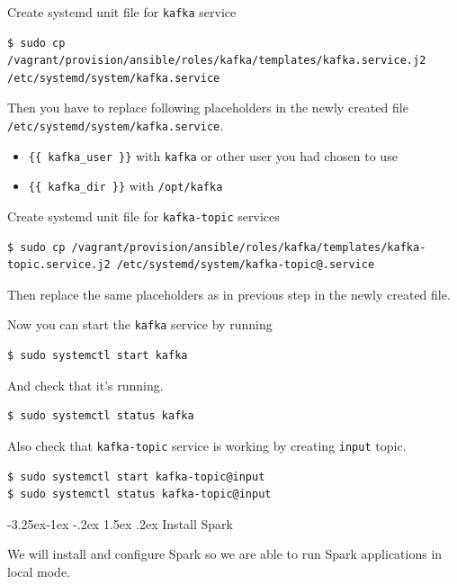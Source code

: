 \documentclass[a4paper]{article} %
\makeatletter
\renewcommand{\normalsize}{\fontsize{12}{15}\selectfont\color{textcolor}}
\renewcommand\subsubsection{\@startsection{subsubsection}{3}{\z@}%
                   {-3.25ex\@plus -1ex \@minus -.2ex}%
                   {1.5ex \@plus .2ex}%
                   {\normalfont\normalsize\sffamily\bfseries\color{projectcolor}}}
\makeatother
\begin{document}
Create systemd unit file for \texttt{kafka} service
\begin{lstlisting}
$ sudo cp /vagrant/provision/ansible/roles/kafka/templates/kafka.service.j2 /etc/systemd/system/kafka.service
\end{lstlisting}

Then you have to replace following placeholders in the newly created file \texttt{/etc/systemd/system/kafka.service}.

\begin{itemize}
\item \texttt{\{\{ kafka\_user \}\}} with \texttt{kafka} or other user you had chosen to use
\item \texttt{\{\{ kafka\_dir \}\}} with \texttt{/opt/kafka}
\end{itemize}

Create systemd unit file for \texttt{kafka-topic} services

\begin{lstlisting}
$ sudo cp /vagrant/provision/ansible/roles/kafka/templates/kafka-topic.service.j2 /etc/systemd/system/kafka-topic@.service
\end{lstlisting}

Then replace the same placeholders as in previous step in the newly created file.

Now you can start the \texttt{kafka} service by running

\begin{lstlisting}
$ sudo systemctl start kafka
\end{lstlisting}

And check that it's running.

\begin{lstlisting}
$ sudo systemctl status kafka
\end{lstlisting}

Also check that \texttt{kafka-topic} service is working by creating \texttt{input} topic.

\begin{lstlisting}
$ sudo systemctl start kafka-topic@input
$ sudo systemctl status kafka-topic@input
\end{lstlisting}


\subsubsection{Install Spark}

We will install and configure Spark so we are able to run Spark applications in local mode.
\end{document}
